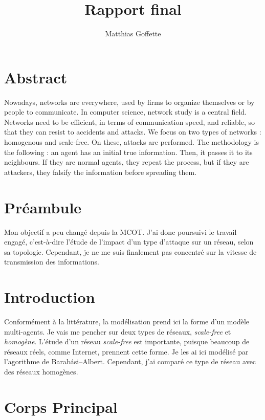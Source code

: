 \documentclass[11pt,a4paper]{article}
\title{Rapport final}
\author{Matthias Goffette}
\begin{document}
\maketitle

\section{Abstract} %

	Nowadays, networks are everywhere, used by firms to organize themselves or by people to communicate. In computer science, network study is a central field. Networks need to be efficient, in terms of communication speed, and reliable, so that they can resist to accidents and attacks. We focus on two types of networks : homogenous and scale-free. On these, attacks are performed. The methodology is the following : an agent has an initial true information. Then, it passes it to its neighbours. If they are normal agents, they repeat the process, but if they are attackers, they falsify the information before spreading them. 



\section{Préambule} %

	Mon objectif a peu changé depuis la MCOT. J'ai donc poursuivi le travail engagé, c'est-à-dire l'étude de l'impact d'un type d'attaque sur un réseau, selon sa topologie. Cependant, je ne me suis finalement pas concentré sur la vitesse de transmission des informations.

\section{Introduction} %

	Conformément à la littérature, la modélisation prend ici la forme d'un modèle multi-agents. Je vais me pencher sur deux types de réseaux, \emph{scale-free} et \emph{homogène}. L'étude d'un réseau \emph{scale-free} est importante, puisque beaucoup de réseaux réels, comme Internet, prennent cette forme. Je les ai ici modélisé par l'agorithme de Barabási–Albert. Cependant, j'ai comparé ce type de réseau avec des réseaux homogènes.

\section{Corps Principal} %
\end{document}
